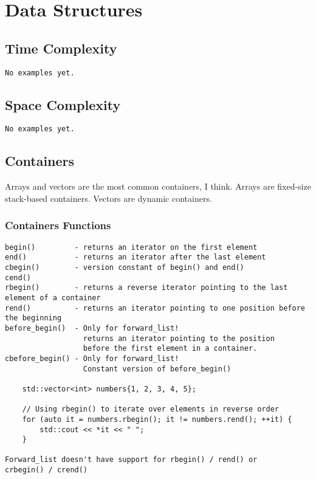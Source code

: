 \chapter{Data Structures}

\section{Time Complexity}
\begin{verbatim}
No examples yet.
\end{verbatim}

\section{Space Complexity}
\begin{verbatim}
No examples yet.
\end{verbatim}

\section{Containers}

Arrays and vectors are the most common containers, I think. Arrays are fixed-size stack-based containers. Vectors
are dynamic containers.

\subsection{Containers Functions}

\begin{verbatim}
begin()         - returns an iterator on the first element 
end()           - returns an iterator after the last element
cbegin()        - version constant of begin() and end()
cend()  
rbegin()        - returns a reverse iterator pointing to the last element of a container
rend()          - returns an iterator pointing to one position before the beginning
before_begin()  - Only for forward_list! 
                  returns an iterator pointing to the position
                  before the first element in a container.  
cbefore_begin() - Only for forward_list!
                  Constant version of before_begin()

    std::vector<int> numbers{1, 2, 3, 4, 5};

    // Using rbegin() to iterate over elements in reverse order
    for (auto it = numbers.rbegin(); it != numbers.rend(); ++it) {
        std::cout << *it << " ";
    }

Forward_list doesn't have support for rbegin() / rend() or
crbegin() / crend()
\end{verbatim}

